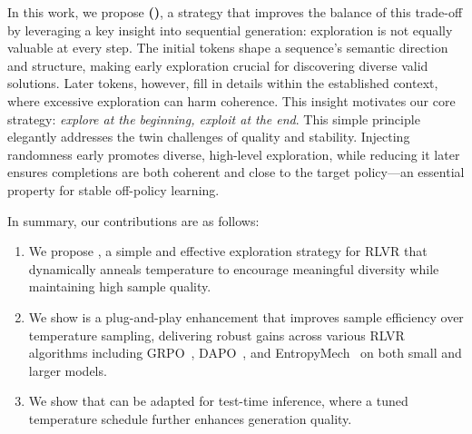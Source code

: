 In this work, we propose \textbf{\algname (\alg)}, a strategy that improves the balance of this trade-off by leveraging a key insight into sequential generation: exploration is not equally valuable at every step.
%
The initial tokens shape a sequence's semantic direction and structure, making early exploration crucial for discovering diverse valid solutions. 
%
Later tokens, however, fill in details within the established context, where excessive exploration can harm coherence.
%
This insight motivates our core strategy: \textit{explore at the beginning, exploit at the end}. 
%
This simple principle elegantly addresses the twin challenges of quality and stability. 
%
Injecting randomness early promotes diverse, high-level exploration, while reducing it later ensures completions are both coherent and close to the target policy---an essential property for stable off-policy learning.

In summary, our contributions are as follows:
\begin{enumerate}[wide, labelwidth=!, labelindent=0pt, nosep]
    \item[\circone] We propose \alg, a simple and effective exploration strategy for RLVR that dynamically anneals temperature to encourage meaningful diversity while maintaining high sample quality.
    \item[\circtwo] We show \alg is a plug-and-play enhancement that improves sample efficiency over temperature sampling, delivering robust gains across various RLVR algorithms including GRPO~\citep{shao2024deepseekmath}, DAPO~\citep{yu2025dapo}, and EntropyMech~\citep{cui2025entropy} on both small and larger models.
    \item[\circthree] We show that \alg can be adapted for test-time inference, where a tuned temperature schedule further enhances generation quality.
\end{enumerate}
